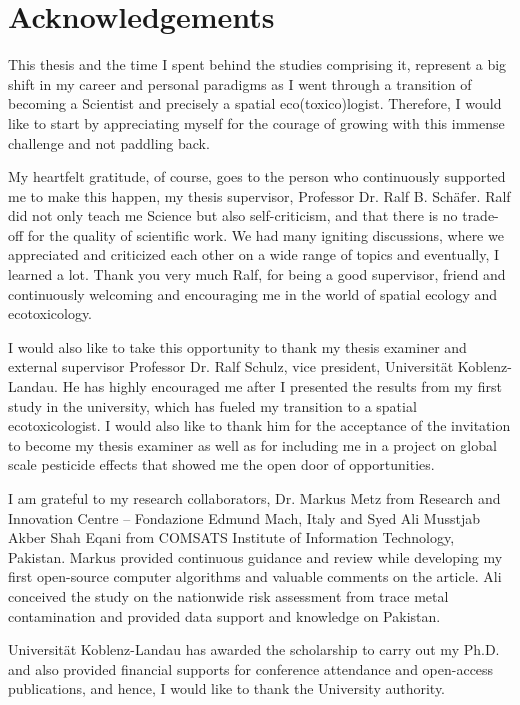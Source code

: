 \chapter{Acknowledgements}
\label{Acknowledgements}

This thesis and the time I spent behind the studies comprising it, represent a big shift in my career and personal paradigms as I went through a transition of becoming a Scientist and precisely a spatial eco(toxico)logist. Therefore, I would like to start by appreciating myself for the courage of growing with this immense challenge and not paddling back.

My heartfelt gratitude, of course, goes to the person who continuously supported me to make this happen, my thesis supervisor, Professor Dr. Ralf B. Schäfer. Ralf did not only teach me Science but also self-criticism, and that there is no trade-off for the quality of scientific work. We had many igniting discussions, where we appreciated and criticized each other on a wide range of topics and eventually, I learned a lot. Thank you very much Ralf, for being a good supervisor, friend and continuously welcoming and encouraging me in the world of spatial ecology and ecotoxicology. 

I would also like to take this opportunity to thank my thesis examiner and external supervisor Professor Dr. Ralf Schulz, vice president, Universität Koblenz-Landau. He has highly encouraged me after I presented the results from my first study in the university, which has fueled my transition to a spatial ecotoxicologist. I would also like to thank him for the acceptance of the invitation to become my thesis examiner as well as for including me in a project on global scale pesticide effects that showed me the open door of opportunities.

I am grateful to my research collaborators, Dr. Markus Metz from Research and Innovation Centre -- Fondazione Edmund Mach, Italy and Syed Ali Musstjab Akber Shah Eqani from COMSATS Institute of Information Technology, Pakistan. Markus provided continuous guidance and review while developing my first open-source computer algorithms and valuable comments on the article. Ali conceived the study on the nationwide risk assessment from trace metal contamination and provided data support and knowledge on Pakistan.

Universität Koblenz-Landau has awarded the scholarship to carry out my Ph.D. and also provided financial supports for conference attendance and open-access publications, and hence, I would like to thank the University authority.


